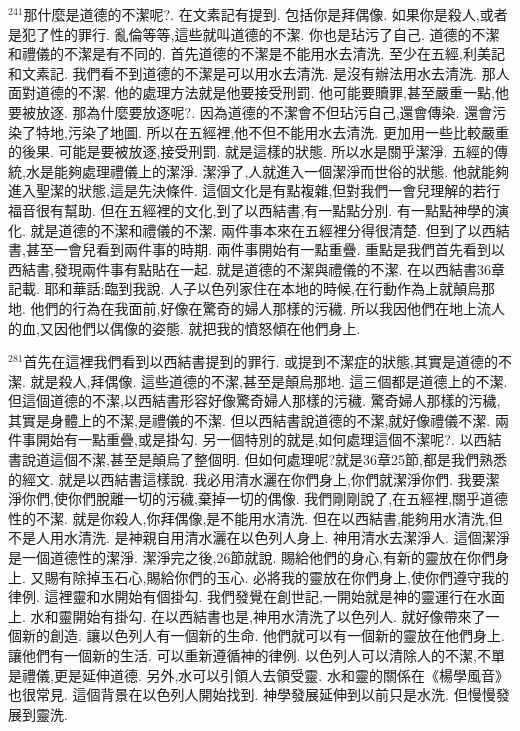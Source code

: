 \documentclass{book}
\begin{document}
$^{241}$那什麼是道德的不潔呢?.
在文素記有提到.
包括你是拜偶像.
如果你是殺人,或者是犯了性的罪行.
亂倫等等,這些就叫道德的不潔.
你也是玷污了自己.
道德的不潔和禮儀的不潔是有不同的.
首先道德的不潔是不能用水去清洗.
至少在五經,利美記和文素記.
我們看不到道德的不潔是可以用水去清洗.
是沒有辦法用水去清洗.
那人面對道德的不潔.
他的處理方法就是他要接受刑罰.
他可能要贖罪,甚至嚴重一點,他要被放逐.
那為什麼要放逐呢?.
因為道德的不潔會不但玷污自己,還會傳染.
還會污染了特地,污染了地圖.
所以在五經裡,他不但不能用水去清洗.
更加用一些比較嚴重的後果.
可能是要被放逐,接受刑罰.
就是這樣的狀態.
所以水是關乎潔淨.
五經的傳統,水是能夠處理禮儀上的潔淨.
潔淨了,人就進入一個潔淨而世俗的狀態.
他就能夠進入聖潔的狀態,這是先決條件.
這個文化是有點複雜,但對我們一會兒理解的若行福音很有幫助.
但在五經裡的文化,到了以西結書,有一點點分別.
有一點點神學的演化.
就是道德的不潔和禮儀的不潔.
兩件事本來在五經裡分得很清楚.
但到了以西結書,甚至一會兒看到兩件事的時期.
兩件事開始有一點重疊.
重點是我們首先看到以西結書,發現兩件事有點貼在一起.
就是道德的不潔與禮儀的不潔.
在以西結書36章記載.
耶和華話:臨到我說.
人子以色列家住在本地的時候,在行動作為上就顛烏那地.
他們的行為在我面前,好像在驚奇的婦人那樣的污穢.
所以我因他們在地上流人的血,又因他們以偶像的姿態.
就把我的憤怒傾在他們身上.

$^{281}$首先在這裡我們看到以西結書提到的罪行.
或提到不潔症的狀態,其實是道德的不潔.
就是殺人,拜偶像.
這些道德的不潔,甚至是顛烏那地.
這三個都是道德上的不潔.
但這個道德的不潔,以西結書形容好像驚奇婦人那樣的污穢.
驚奇婦人那樣的污穢,其實是身體上的不潔,是禮儀的不潔.
但以西結書說道德的不潔,就好像禮儀不潔.
兩件事開始有一點重疊,或是掛勾.
另一個特別的就是,如何處理這個不潔呢?.
以西結書說道這個不潔,甚至是顛烏了整個明.
但如何處理呢?就是36章25節,都是我們熟悉的經文.
就是以西結書這樣說.
我必用清水灑在你們身上,你們就潔淨你們.
我要潔淨你們,使你們脫離一切的污穢,棄掉一切的偶像.
我們剛剛說了,在五經裡,關乎道德性的不潔.
就是你殺人,你拜偶像,是不能用水清洗.
但在以西結書,能夠用水清洗,但不是人用水清洗.
是神親自用清水灑在以色列人身上.
神用清水去潔淨人.
這個潔淨是一個道德性的潔淨.
潔淨完之後,26節就說.
賜給他們的身心,有新的靈放在你們身上.
又賜有除掉玉石心,賜給你們的玉心.
必將我的靈放在你們身上,使你們遵守我的律例.
這裡靈和水開始有個掛勾.
我們發覺在創世記,一開始就是神的靈運行在水面上.
水和靈開始有掛勾.
在以西結書也是,神用水清洗了以色列人.
就好像帶來了一個新的創造.
讓以色列人有一個新的生命.
他們就可以有一個新的靈放在他們身上.
讓他們有一個新的生活.
可以重新遵循神的律例.
以色列人可以清除人的不潔,不單是禮儀,更是延伸道德.
另外,水可以引領人去領受靈.
水和靈的關係在《楊學風音》也很常見.
這個背景在以色列人開始找到.
神學發展延伸到以前只是水洗.
但慢慢發展到靈洗.
\end{document}
